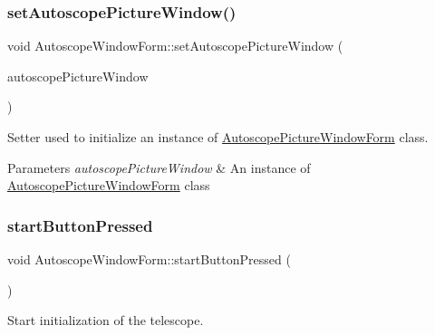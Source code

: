 \subsubsection{\texorpdfstring{setAutoscopePictureWindow()}{setAutoscopePictureWindow()}}
{\footnotesize\ttfamily void Autoscope\+Window\+Form\+::set\+Autoscope\+Picture\+Window (\begin{DoxyParamCaption}\item[{\mbox{\hyperlink{class_autoscope_picture_window_form}{Autoscope\+Picture\+Window\+Form}} $\ast$}]{autoscope\+Picture\+Window }\end{DoxyParamCaption})\hspace{0.3cm}{\ttfamily [inline]}}



Setter used to initialize an instance of \mbox{\hyperlink{class_autoscope_picture_window_form}{Autoscope\+Picture\+Window\+Form}} class. 


\begin{DoxyParams}{Parameters}
{\em autoscope\+Picture\+Window} & An instance of \mbox{\hyperlink{class_autoscope_picture_window_form}{Autoscope\+Picture\+Window\+Form}} class \\
\hline
\end{DoxyParams}
\mbox{\label{class_autoscope_window_form_ac6b0a28c17efb188b234ce1c08baa82d}} 
\subsubsection{\texorpdfstring{startButtonPressed}{startButtonPressed}}
{\footnotesize\ttfamily void Autoscope\+Window\+Form\+::start\+Button\+Pressed (\begin{DoxyParamCaption}\item[{void}]{ }\end{DoxyParamCaption})\hspace{0.3cm}{\ttfamily [slot]}}



Start initialization of the telescope. 

\mbox{\label{class_autoscope_window_form_ac78048dc833bd4952108cb5fe8cac6f8}} 
